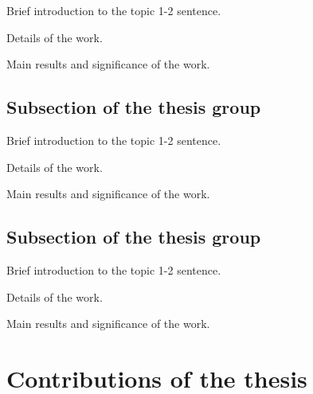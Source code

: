 \documentclass{article}
\begin{document}

Brief introduction to the topic 1-2 sentence.

Details of the work.

Main results and significance of the work.

\subsection{Subsection of the thesis group}


Brief introduction to the topic 1-2 sentence.

Details of the work.

Main results and significance of the work.

\subsection{Subsection of the thesis group}


Brief introduction to the topic 1-2 sentence.

Details of the work.

Main results and significance of the work.

\vspace*{1em}

\section{Contributions of the thesis}
\end{document}
